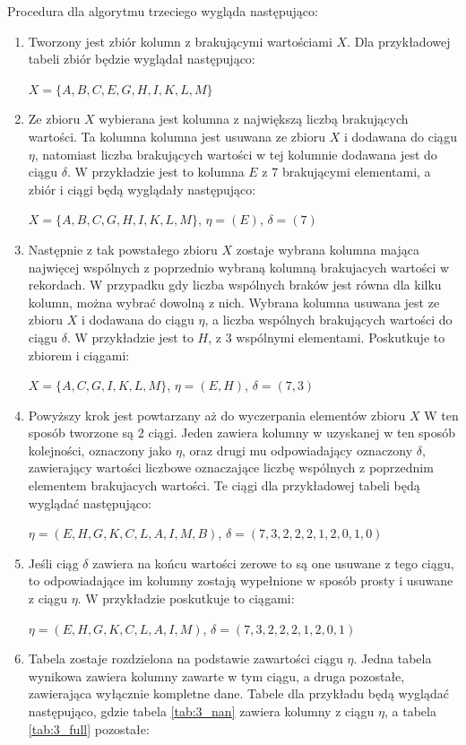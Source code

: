 \documentclass[12pt,twoside]{article}
\begin{document}
Procedura dla algorytmu trzeciego wygląda następująco:

\begin{enumerate}[label=\arabic*), leftmargin=1.25cm]
    \item Tworzony jest zbiór kolumn z brakującymi wartościami $X$.
          Dla przykładowej tabeli zbiór będzie wyglądał następująco:

          $X=\{A,B,C,E,G,H,I,K,L,M\}$
    \item Ze zbioru $X$ wybierana jest kolumna z największą liczbą brakujących wartości.
          Ta kolumna kolumna jest usuwana ze zbioru $X$ i dodawana do ciągu $\eta$,
          natomiast liczba brakujących wartości w tej kolumnie dodawana jest do ciągu $\delta$.
          W przykładzie jest to kolumna $E$ z 7 brakującymi elementami, a zbiór i ciągi będą wyglądały następująco:

          $X=\{A,B,C,G,H,I,K,L,M\}$, $\eta=(E)$, $\delta=(7)$
    \item Następnie z tak powstałego zbioru $X$ zostaje wybrana kolumna mająca najwięcej wspólnych z poprzednio wybraną
          kolumną brakujacych wartości w rekordach.
          W przypadku gdy liczba wspólnych braków jest równa dla kilku kolumn, można wybrać dowolną z nich.
          Wybrana kolumna usuwana jest ze zbioru $X$ i dodawana do ciągu $\eta$,
          a liczba wspólnych brakujących wartości do ciągu $\delta$.
          W przykładzie jest to $H$, z 3 wspólnymi elementami. Poskutkuje to zbiorem i ciągami:

          $X=\{A,C,G,I,K,L,M\}$, $\eta=(E,H)$, $\delta=(7,3)$
    \item Powyższy krok jest powtarzany aż do wyczerpania elementów zbioru $X$
          W ten sposób tworzone są 2 ciągi. Jeden zawiera kolumny w uzyskanej w ten sposób kolejności, oznaczony jako $\eta$,
          oraz drugi mu odpowiadający oznaczony $\delta$,
          zawierający wartości liczbowe oznaczające liczbę wspólnych z poprzednim elementem brakujacych wartości.
          Te ciągi dla przykładowej tabeli będą wyglądać następująco:

          $\eta=(E,H,G,K,C,L,A,I,M,B)$, $\delta=(7,3,2,2,2,1,2,0,1,0)$
    \item Jeśli ciąg $\delta$ zawiera na końcu wartości zerowe to są one usuwane z tego ciągu,
          to odpowiadające im kolumny zostają wypełnione w sposób prosty i usuwane z ciągu $\eta$.
          W przykładzie poskutkuje to ciągami:

          $\eta=(E,H,G,K,C,L,A,I,M)$, $\delta=(7,3,2,2,2,1,2,0,1)$
    \item Tabela zostaje rozdzielona na podstawie zawartości ciągu $\eta$.
          Jedna tabela wynikowa zawiera kolumny zawarte w tym ciągu, a druga pozostałe, zawierająca wyłącznie kompletne dane.
          Tabele dla przykładu będą wyglądać następująco, gdzie tabela \ref{tab:3_nan} zawiera kolumny z ciągu $\eta$, a tabela \ref{tab:3_full} pozostałe:


\end{enumerate}
\end{document}
